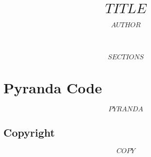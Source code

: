 \documentclass[11pt, oneside]{article}   	%
\title{$$TITLE$$}
\author{$$AUTHOR$$}
\begin{document}
\maketitle


$$SECTIONS$$


\section{Pyranda Code}
$$PYRANDA$$
\subsection{Copyright}
$$COPY$$
\end{document}
